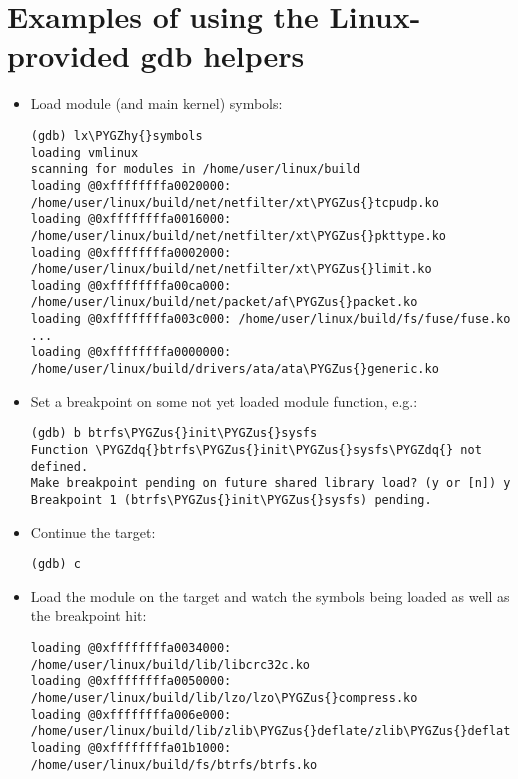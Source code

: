 \documentclass[a4paper,8pt,english]{sphinxmanual}
\def\PYGZus{\char`\_}
\def\PYGZhy{\char`\-}
\def\PYGZdq{\char`\"}
\begin{document}
\section{Examples of using the Linux-provided gdb helpers}
\label{dev-tools/gdb-kernel-debugging:examples-of-using-the-linux-provided-gdb-helpers}\begin{itemize}
\item {} 
Load module (and main kernel) symbols:

\begin{Verbatim}[commandchars=\\\{\}]
(gdb) lx\PYGZhy{}symbols
loading vmlinux
scanning for modules in /home/user/linux/build
loading @0xffffffffa0020000: /home/user/linux/build/net/netfilter/xt\PYGZus{}tcpudp.ko
loading @0xffffffffa0016000: /home/user/linux/build/net/netfilter/xt\PYGZus{}pkttype.ko
loading @0xffffffffa0002000: /home/user/linux/build/net/netfilter/xt\PYGZus{}limit.ko
loading @0xffffffffa00ca000: /home/user/linux/build/net/packet/af\PYGZus{}packet.ko
loading @0xffffffffa003c000: /home/user/linux/build/fs/fuse/fuse.ko
...
loading @0xffffffffa0000000: /home/user/linux/build/drivers/ata/ata\PYGZus{}generic.ko
\end{Verbatim}

\item {} 
Set a breakpoint on some not yet loaded module function, e.g.:

\begin{Verbatim}[commandchars=\\\{\}]
(gdb) b btrfs\PYGZus{}init\PYGZus{}sysfs
Function \PYGZdq{}btrfs\PYGZus{}init\PYGZus{}sysfs\PYGZdq{} not defined.
Make breakpoint pending on future shared library load? (y or [n]) y
Breakpoint 1 (btrfs\PYGZus{}init\PYGZus{}sysfs) pending.
\end{Verbatim}

\item {} 
Continue the target:

\begin{Verbatim}[commandchars=\\\{\}]
(gdb) c
\end{Verbatim}

\item {} 
Load the module on the target and watch the symbols being loaded as well as
the breakpoint hit:

\begin{Verbatim}[commandchars=\\\{\}]
loading @0xffffffffa0034000: /home/user/linux/build/lib/libcrc32c.ko
loading @0xffffffffa0050000: /home/user/linux/build/lib/lzo/lzo\PYGZus{}compress.ko
loading @0xffffffffa006e000: /home/user/linux/build/lib/zlib\PYGZus{}deflate/zlib\PYGZus{}deflate.ko
loading @0xffffffffa01b1000: /home/user/linux/build/fs/btrfs/btrfs.ko


\end{Verbatim}
\end{itemize}
\end{document}

